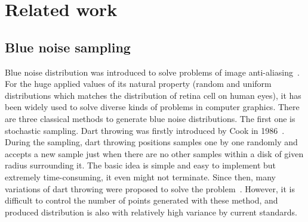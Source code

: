 \section{Related work}

\subsection{Blue noise sampling}
Blue noise distribution was introduced to solve
problems of image anti-aliasing~\cite{dippe:1985:antialiasing}. For
the huge applied values of its natural property (random and uniform
distributions which matches the distribution of retina cell on human eyes),
it has been widely used to solve diverse kinds of problems in computer
graphics.
There are three classical methods to generate blue noise
distributions.
The first one is stochastic sampling.
Dart throwing was firstly introduced by
Cook in 1986~\cite{cook:1986:stochastic}. During the sampling, dart throwing positions
samples one by one randomly and accepts a new sample just when there are no
other samples within a disk of given radius surrounding it. The basic idea
is simple and easy to implement but extremely time-consuming, it even might
not terminate. Since then, many variations of dart throwing were proposed to
solve the problem~\cite{Mitchell:1987:generating,dunbar:2006:spatial,white:2007:poisson,wei:2008:parallel,gamito:2009:accurate,ebeida:2011:efficient}.
However, it is difficult to control the number of points generated with these method,
and produced distribution is also with relatively high variance
by current standards.

